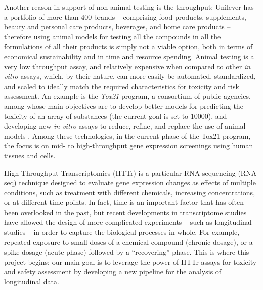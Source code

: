 Another reason in support of non-animal testing is the throughput: Unilever has a portfolio of more than \num{400} brands -- comprising food products, supplements, beauty and personal care products, beverages, and home care products -- therefore using animal models for testing all the compounds in all the formulations of all their products is simply not a viable option, both in terms of economical sustainability and in time and resource spending.
Animal testing is a very low throughput assay, and relatively expensive when compared to other \textit{in vitro} assays, which, by their nature, can more easily be automated, standardized, and scaled to ideally match the required characteristics for toxicity and risk assessment. An example is the \emph{Tox21} program, a consortium of public agencies, among whose main objectives are to develop better models for predicting the toxicity of an array of substances (the current goal is set to \num{10000}), and developing new \textit{in vitro} assays to reduce, refine, and replace the use of animal models \citep{lynchHighThroughputScreeningAdvance2023}. Among these technologies, in the current phase of the Tox21 program, the focus is on mid- to high-throughput gene expression screenings using human tissues and cells.

High Throughput Transcriptomics (HTTr) is a particular RNA sequencing (RNA-seq) technique designed to evaluate gene expression changes as effects of multiple conditions, such as treatment with different chemicals, increasing concentrations, or at different time points. In fact, time is an important factor that has often been overlooked in the past, but recent developments in transcriptome studies have allowed the design of more complicated experiments -- such as longitudinal studies -- in order to capture the biological processes in whole. For example, repeated exposure to small doses of a chemical compound (chronic dosage), or a spike dosage (acute phase) followed by a ``recovering'' phase. This is where this project begins: our main goal is to leverage the power of HTTr assays for toxicity and safety assessment by developing a new pipeline for the analysis of longitudinal data.

